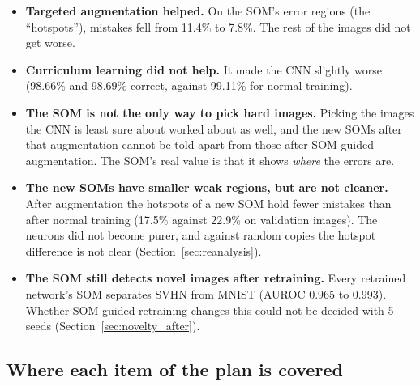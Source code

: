 \documentclass[11pt]{article}
\begin{document}
\begin{itemize}[leftmargin=1.4em, itemsep=1pt]
  \item \textbf{Targeted augmentation helped.} On the SOM's error regions (the ``hotspots''), mistakes fell from 11.4\% to 7.8\%. The rest of the images did not get worse.
  \item \textbf{Curriculum learning did not help.} It made the CNN slightly worse (98.66\% and 98.69\% correct, against 99.11\% for normal training).
  \item \textbf{The SOM is not the only way to pick hard images.} Picking the images the CNN is least sure about worked about as well, and the new SOMs after that augmentation cannot be told apart from those after SOM-guided augmentation. The SOM's real value is that it shows \emph{where} the errors are.
  \item \textbf{The new SOMs have smaller weak regions, but are not cleaner.} After augmentation the hotspots of a new SOM hold fewer mistakes than after normal training (17.5\% against 22.9\% on validation images). The neurons did not become purer, and against random copies the hotspot difference is not clear (Section~\ref{sec:reanalysis}).
  \item \textbf{The SOM still detects novel images after retraining.} Every retrained network's SOM separates SVHN from MNIST (AUROC 0.965 to 0.993). Whether SOM-guided retraining changes this could not be decided with 5 seeds (Section~\ref{sec:novelty_after}).
\end{itemize}

\subsection*{Where each item of the plan is covered}
\end{document}
